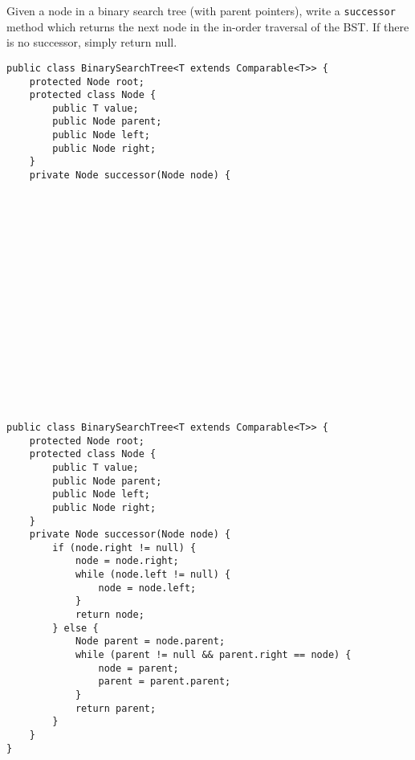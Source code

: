 \begin{blocksection}
\question Given a node in a binary search tree (with parent pointers), write a
\lstinline$successor$ method which returns the next node in the in-order
traversal of the BST. If there is no successor, simply return null.

\ifprintanswers
\else
\begin{lstlisting}
public class BinarySearchTree<T extends Comparable<T>> {
    protected Node root;
    protected class Node {
        public T value;
        public Node parent;
        public Node left;
        public Node right;
    }
    private Node successor(Node node) {


















\end{lstlisting}
\fi

\begin{solution}[2.5in]
\begin{lstlisting}
public class BinarySearchTree<T extends Comparable<T>> {
    protected Node root;
    protected class Node {
        public T value;
        public Node parent;
        public Node left;
        public Node right;
    }
    private Node successor(Node node) {
        if (node.right != null) {
            node = node.right;
            while (node.left != null) {
                node = node.left;
            }
            return node;
        } else {
            Node parent = node.parent;
            while (parent != null && parent.right == node) {
                node = parent;
                parent = parent.parent;
            }
            return parent;
        }
    }
}
\end{lstlisting}
\end{solution}
\end{blocksection}
